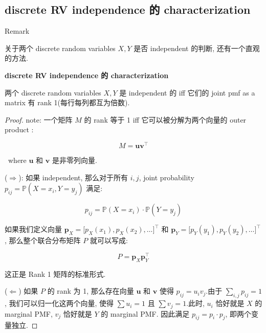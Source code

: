 \documentclass{qlnotes-export}
\begin{document}
\subsection{discrete RV independence 的 characterization}\label{discrete-rv-independence-ux7684-characterization}

\begin{qlremark}{Remark}

关于两个 discrete random variables \(X,Y\) 是否 independent 的判断, 还有一个直观的方法.

\begin{proposition}{\protect{}\label{kn-discrete-rv-independence-characterization}{\textbf{discrete
RV independence 的 characterization}}}

两个 discrete random variables \(X,Y\) 是 independent 的 iff 它们的 joint pmf as a matrix 有 rank 1(每行每列都互为倍数).

\end{proposition}

\begin{proof}

note: 一个矩阵 \(M\) 的 rank 等于 1 iff 它可以被分解为两个向量的 outer product :

\[M = \mathbf{u}\mathbf{v}^{\top}\]

~where \(\mathbf{u}\) 和 \(\mathbf{v}\) 是非零列向量.

(\(\Longrightarrow\)): 如果 independent, 那么对于所有 \(i,j\), joint probability \(p_{ij} = {\mathbb{P}}(X = x_{i},Y = y_{j})\) 满足:

\[p_{ij} = {\mathbb{P}}(X = x_{i}) \cdot {\mathbb{P}}(Y = y_{j})\]

如果我们定义向量 \(\mathbf{p}_{X} = \lbrack p_{X}(x_{1}),p_{X}(x_{2}),\ldots\rbrack^{\top}\) 和 \(\mathbf{p}_{Y} = \lbrack p_{Y}(y_{1}),p_{Y}(y_{2}),\ldots\rbrack^{\top}\), 那么整个联合分布矩阵 \(P\) 就可以写成:

\[P = \mathbf{p}_{X}\mathbf{p}_{Y}^{\top}\]

这正是 Rank 1 矩阵的标准形式.

(\(\Longleftarrow\)) 如果 \(P\) 的 rank 为 1, 那么存在向量 \(\mathbf{u}\) 和 \(\mathbf{v}\) 使得 \(p_{ij} = u_{i}v_{j}\).由于 \(\sum_{i,j}p_{ij} = 1\), 我们可以归一化这两个向量, 使得 \(\sum u_{i} = 1\) 且 \(\sum v_{j} = 1\).此时, \(u_{i}\) 恰好就是 \(X\) 的 marginal PMF, \(v_{j}\) 恰好就是 \(Y\) 的 marginal PMF. 因此满足 \(p_{ij} = p_{i} \cdot p_{j}\), 即两个变量独立.

\end{proof}


\end{qlremark}
\end{document}

